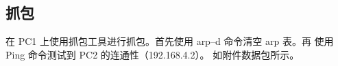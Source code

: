 \documentclass[a4paper,12pt]{report}
\begin{document}
\begin{spacing}{1.5}
\subsection{抓包}
在 PC1 上使用抓包工具进行抓包。首先使用 arp–d 命令清空 arp 表。再 使用 Ping 命令测试到 PC2 的连通性（192.168.4.2）。
如附件数据包所示。



\end{spacing}
\end{document}
